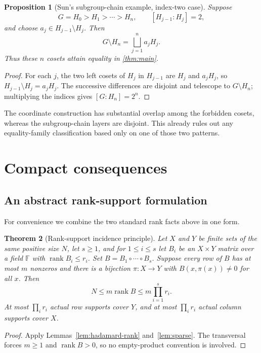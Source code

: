 \documentclass[11pt,a4paper]{amsart}
\newtheorem{theorem}{Theorem}[section]
\newtheorem{proposition}[theorem]{Proposition}
\theoremstyle{definition}
\theoremstyle{remark}
\newcommand{\rank}{\operatorname{rank}}
\newcommand{\Had}{\mathbin{\circ}}
\newcommand{\F}{\mathbb{F}}
\begin{document}
\begin{proposition}[Sun's subgroup-chain example, index-two case]\label{prop:sun-chain}
Suppose
\[
  G=H_0>H_1>\cdots>H_n,\qquad [H_{j-1}:H_j]=2,
\]
and choose $a_j\in H_{j-1}\setminus H_j$.  Then
\[
  G\setminus H_n=\bigsqcup_{j=1}^n a_jH_j.
\]
Thus these $n$ cosets attain equality in \cref{thm:main}.
\end{proposition}

\begin{proof}
For each $j$, the two left cosets of $H_j$ in $H_{j-1}$ are $H_j$ and
$a_jH_j$, so $H_{j-1}\setminus H_j=a_jH_j$.  The successive differences are
disjoint and telescope to $G\setminus H_n$; multiplying the indices gives
$[G:H_n]=2^n$.
\end{proof}

The coordinate construction has substantial overlap among the forbidden
cosets, whereas the subgroup-chain layers are disjoint.  This already rules
out any equality-family classification based only on one of those two patterns.

\appendix
\section{Compact consequences}

\subsection{An abstract rank-support formulation}
For convenience we combine the two standard rank facts above in one form.

\begin{theorem}[Rank-support incidence principle]\label{thm:abstract}
Let $X$ and $Y$ be finite sets of the same positive size $N$, let $s\ge1$, and
for $1\le i\le s$ let $B_i$ be an $X\times Y$ matrix over a field $\F$ with
$\rank B_i\le r_i$.  Set $B=B_1\Had\cdots\Had B_s$.  Suppose every row of
$B$ has at most $m$ nonzeros and there is a bijection $\pi:X\to Y$ with
$B(x,\pi(x))\ne0$ for all $x$.  Then
\[
  N\le m\rank B\le m\prod_{i=1}^s r_i.
\]
At most $\prod_i r_i$ actual row supports cover $Y$, and at most
$\prod_i r_i$ actual column supports cover $X$.
\end{theorem}

\begin{proof}
Apply Lemmas~\ref{lem:hadamard-rank} and~\ref{lem:sparse}.  The transversal forces $m\ge1$
and $\rank B>0$, so no empty-product convention is involved.
\end{proof}
\end{document}
